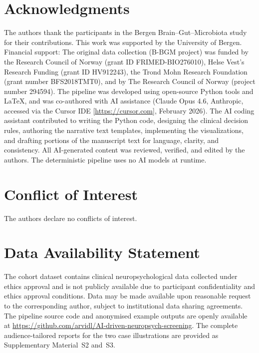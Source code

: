 \documentclass[11pt,a4paper]{article}
\begin{document}
\section*{Acknowledgments}

The authors thank the participants in the Bergen Brain--Gut--Microbiota study for their contributions. This work was supported by the University of Bergen. Financial support: The original data collection (B-BGM project) was funded by the Research Council of Norway (grant ID FRIMED-BIO276010), Helse Vest's Research Funding (grant ID HV912243), the Trond Mohn Research Foundation (grant number BFS2018TMT0), and by The Research Council of Norway (project number 294594). The pipeline was developed using open-source Python tools and \LaTeX, and was co-authored with AI assistance (Claude Opus 4.6, Anthropic, accessed via the Cursor IDE [\url{https://cursor.com}], February 2026). The AI coding assistant contributed to writing the Python code, designing the clinical decision rules, authoring the narrative text templates, implementing the visualizations, and drafting portions of the manuscript text for language, clarity, and consistency. All AI-generated content was reviewed, verified, and edited by the authors. The deterministic pipeline uses no AI models at runtime.

\section*{Conflict of Interest}

The authors declare no conflicts of interest.

\section*{Data Availability Statement}

The cohort dataset contains clinical neuropsychological data collected under ethics approval and is not publicly available due to participant confidentiality and ethics approval conditions. Data may be made available upon reasonable request to the corresponding author, subject to institutional data sharing agreements. 
The pipeline source code and anonymised example outputs are openly available 
at \url{https://github.com/arvidl/AI-driven-neuropsych-screening}. 
The complete audience-tailored reports for the two case illustrations are provided as Supplementary Material~S2 and~S3.
\end{document}
